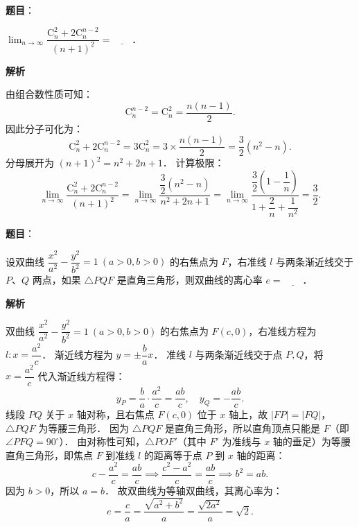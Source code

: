 \begin{answer}

\textbf{题目}：

$\lim_{n \to \infty} \dfrac{\mathrm{C}_n^2 + 2\mathrm{C}_n^{n-2}}{(n+1)^2} = \underline{\hspace{2em}}$．

\textbf{解析}

由组合数性质可知：
\nopagebreak[4]
\[
\mathrm{C}_n^{n-2} = \mathrm{C}_n^2 = \dfrac{n(n-1)}{2}.
\]
因此分子可化为：
\nopagebreak[4]
\[
\mathrm{C}_n^2 + 2\mathrm{C}_n^{n-2} = 3\mathrm{C}_n^2 = 3 \times \dfrac{n(n-1)}{2} = \dfrac{3}{2}(n^2 - n).
\]
分母展开为 $(n+1)^2 = n^2 + 2n + 1$．
计算极限：
\nopagebreak[4]
\[
\lim_{n \to \infty} \dfrac{\mathrm{C}_n^2 + 2\mathrm{C}_n^{n-2}}{(n+1)^2} = \lim_{n \to \infty} \dfrac{\dfrac{3}{2}(n^2 - n)}{n^2 + 2n + 1} = \lim_{n \to \infty} \dfrac{\dfrac{3}{2}\left(1 - \dfrac{1}{n}\right)}{1 + \dfrac{2}{n} + \dfrac{1}{n^2}} = \dfrac{3}{2}.
\]


\end{answer}
\begin{answer}

\textbf{题目}：

设双曲线 $\dfrac{x^2}{a^2} - \dfrac{y^2}{b^2} = 1\ (a > 0, b > 0)$ 的右焦点为 $F$，右准线 $l$ 与两条渐近线交于 $P$、$Q$ 两点，如果 $\triangle PQF$ 是直角三角形，则双曲线的离心率 $e = \underline{\hspace{2em}}$．

\textbf{解析}

双曲线 $\dfrac{x^2}{a^2} - \dfrac{y^2}{b^2} = 1\ (a > 0, b > 0)$ 的右焦点为 $F(c, 0)$，右准线方程为 $l: x = \dfrac{a^2}{c}$．
渐近线方程为 $y = \pm \dfrac{b}{a} x$．
准线 $l$ 与两条渐近线交于点 $P, Q$，将 $x = \dfrac{a^2}{c}$ 代入渐近线方程得：
\nopagebreak[4]
\[
y_P = \dfrac{b}{a} \cdot \dfrac{a^2}{c} = \dfrac{ab}{c}, \quad y_Q = -\dfrac{ab}{c}.
\]
线段 $PQ$ 关于 $x$ 轴对称，且右焦点 $F(c, 0)$ 位于 $x$ 轴上，故 $|FP| = |FQ|$，$\triangle PQF$ 为等腰三角形．
因为 $\triangle PQF$ 是直角三角形，所以直角顶点只能是 $F$（即 $\angle PFQ = 90^\circ$）．
由对称性可知，$\triangle POF'$（其中 $F'$ 为准线与 $x$ 轴的垂足）为等腰直角三角形，即焦点 $F$ 到准线 $l$ 的距离等于点 $P$ 到 $x$ 轴的距离：
\nopagebreak[4]
\[
c - \dfrac{a^2}{c} = \dfrac{ab}{c} \implies \dfrac{c^2 - a^2}{c} = \dfrac{ab}{c} \implies b^2 = ab.
\]
因为 $b > 0$，所以 $a = b$．
故双曲线为等轴双曲线，其离心率为：
\nopagebreak[4]
\[
e = \dfrac{c}{a} = \dfrac{\sqrt{a^2 + b^2}}{a} = \dfrac{\sqrt{2a^2}}{a} = \sqrt{2}.
\]


\end{answer}
